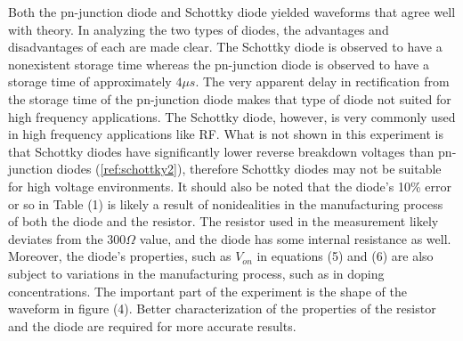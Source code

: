 Both the pn-junction diode and Schottky diode yielded waveforms that agree well with theory. In analyzing the two types of diodes, the advantages and disadvantages of each are made clear. The Schottky diode is observed to have a nonexistent storage time whereas the pn-junction diode is observed to have a storage time of approximately $4\mu s$. The very apparent delay in rectification from the storage time of the pn-junction diode makes that type of diode not suited for high frequency applications. The Schottky diode, however, is very commonly used in high frequency applications like RF. What is not shown in this experiment is that Schottky diodes have significantly lower reverse breakdown voltages than pn-junction diodes  (\ref{ref:schottky2}), therefore Schottky diodes may not be suitable for high voltage environments. 
It should also be noted that the diode's 10\% error or so in Table (1) is likely a result of nonidealities in the manufacturing process of both the diode and the resistor. The resistor used in the measurement likely deviates from the $300\Omega$ value, and the diode has some internal resistance as well. Moreover, the diode's properties, such as $V_{on}$ in equations (5) and (6) are also subject to variations in the manufacturing process, such as in doping concentrations. The important part of the experiment is the shape of the waveform in figure (4). Better characterization of the properties of the resistor and the diode are required for more accurate results.
